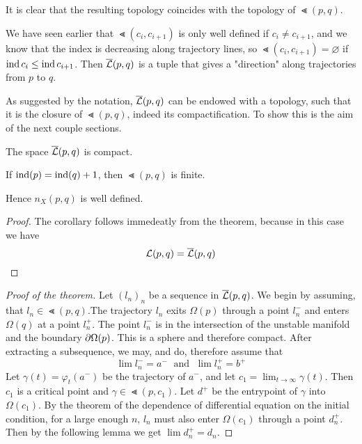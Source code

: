 It is clear  that the resulting topology coincides with the topology
of $\Lt(p, q)$. 

\begin{remark}
    We have seen earlier that $\Lt(c_i, c_{i+1})$ is only well defined if 
    $c_i \neq c_{i + 1}$, and we know that the index is decreasing along trajectory lines,
    so $\Lt(c_i, c_{i+1}) = \varnothing$ if ${ \operatorname{ind} } \, c_i \leq { \operatorname{ind} } \, c_{i + 1}$.
    Then ${\overline{\mathcal{L}} }(p, q)$ is a tuple that gives a "direction" along trajectories
    from $p$ to $q$.
\end{remark}

As suggested by the notation, ${\overline{\mathcal{L}} }(p, q)$ can be endowed with a topology, such that 
it is the closure of $\Lt(p, q)$, indeed its compactification. 
To show this is the aim of the next couple sections.

\begin{theorem}
    The space ${\overline{\mathcal{L}} }(p, q)$ is compact.
\end{theorem}

\begin{corollary}
    If ${ \operatorname{ind} }(p) = { \operatorname{ind} }(q) + 1$, then $\Lt(p, q)$ is finite.
\end{corollary}

\begin{remark}
    Hence $n_X(p, q)$ is well defined.
\end{remark}

\begin{proof}
    The corollary follows immedeatly from the theorem, because in this case we have
    \[ { \mathcal{L} }(p, q) = {\overline{\mathcal{L}} }(p, q) \]
\end{proof}

\begin{proof}[Proof of the theorem]
    Let $(l_n)_n$ be a sequence in ${\overline{\mathcal{L}} }(p, q)$.
    We begin by assuming, that $l_n \in \Lt(p, q)$.The trajectory $l_n$ exits 
    $\Omega(p)$ through a point $l_n^-$ and enters $\Omega(q)$ at a point $l_n^+$.
    The point $l_n^-$ is in the intersection of the unstable manifold and the boundary
    ${ \partial } \Omega (p)$. This is a sphere and therefore compact. After extracting a 
    subsequence, we may, and do, therefore assume that
    \[ \lim l_n^- = a^- \; \text{ and } \; \lim l_n^+ = b^+ \]
    Let $\gamma(t) = \varphi_t(a^-)$ be the trajectory of $a^-$, and let 
    $c_1 = \lim_{t \to \infty} \gamma(t)$. Then $c_1$ is a critical point and 
    $\gamma \in \Lt (p, c_1)$. Let $d^+$ be the entrypoint of $\gamma$ into
    $\Omega (c_1)$. By the theorem of the dependence of differential equation on the 
    initial condition, for a large enough $n$, $l_n$ must also enter $\Omega(c_1)$
    through a point $d_n^+$. Then by the following lemma we get $\lim d_n^+ = d_n$.
\end{proof}
